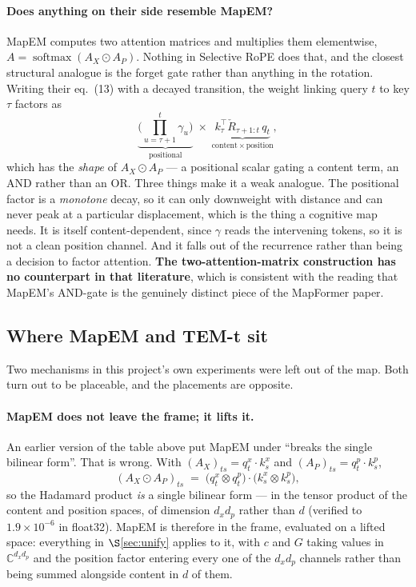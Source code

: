 \documentclass[11pt]{article}
\newcommand{\C}{\mathbb{C}}
\DeclareMathOperator{\softmax}{softmax}
\begin{document}
\paragraph{Does anything on their side resemble MapEM?} MapEM computes two
attention matrices and multiplies them elementwise, $A = \softmax(A_X \odot A_P)$.
Nothing in Selective RoPE does that, and the closest structural analogue is the
forget gate rather than anything in the rotation. Writing their eq.~(13) with a
decayed transition, the weight linking query $t$ to key $\tau$ factors as
\begin{equation}
  \underbrace{\Big(\textstyle\prod_{u=\tau+1}^{t}\gamma_u\Big)}_{\text{positional}}
  \;\times\;
  \underbrace{k_\tau^{\!\top} \check R_{\tau+1:t}\, q_t}_{\text{content}\,\times\,\text{position}},
\end{equation}
which has the \emph{shape} of $A_X \odot A_P$ --- a positional scalar gating a
content term, an AND rather than an OR. Three things make it a weak analogue.
The positional factor is a \emph{monotone} decay, so it can only downweight with
distance and can never peak at a particular displacement, which is the thing a
cognitive map needs. It is itself content-dependent, since $\gamma$ reads the
intervening tokens, so it is not a clean position channel. And it falls out of the
recurrence rather than being a decision to factor attention. \textbf{The
two-attention-matrix construction has no counterpart in that literature}, which
is consistent with the reading that MapEM's AND-gate is the genuinely distinct
piece of the MapFormer paper.

\subsection{Where MapEM and TEM-t sit}
\label{sec:emtem}

Two mechanisms in this project's own experiments were left out of the map. Both
turn out to be placeable, and the placements are opposite.

\paragraph{MapEM does not leave the frame; it lifts it.} An earlier version of the
table above put MapEM under ``breaks the single bilinear form''. That is wrong.
With $(A_X)_{ts} = q^x_t\!\cdot\!k^x_s$ and $(A_P)_{ts} = q^p_t\!\cdot\!k^p_s$,
\[
  (A_X \odot A_P)_{ts}
  \;=\; \big(q^x_t \otimes q^p_t\big)\cdot\big(k^x_s \otimes k^p_s\big),
\]
so the Hadamard product \emph{is} a single bilinear form --- in the tensor product
of the content and position spaces, of dimension $d_xd_p$ rather than $d$ (verified
to $1.9\times10^{-6}$ in float32). MapEM is therefore in the frame, evaluated on a
lifted space: everything in $\S$\ref{sec:unify} applies to it, with $c$ and $G$
taking values in $\C^{d_xd_p}$ and the position factor entering every one of the
$d_xd_p$ channels rather than being summed alongside content in $d$ of them.
\end{document}
